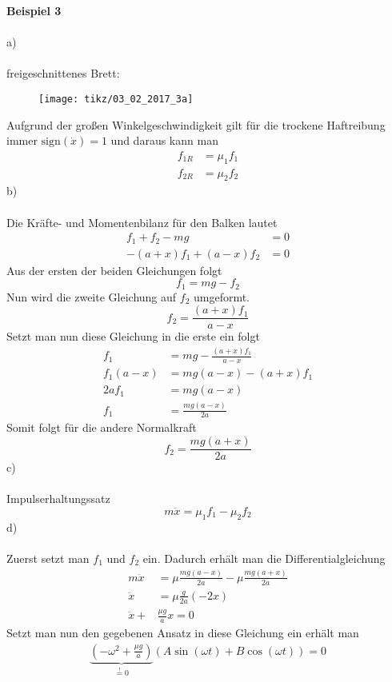 \textbf{Beispiel 3}\\ \\
a)\\ \\
freigeschnittenes Brett:
\begin{figure}[h]
	\centering
	\texttt{[image: tikz/03\_02\_2017\_3a]}
\end{figure}
\newline
Aufgrund der großen Winkelgeschwindigkeit gilt für die trockene Haftreibung immer $\text{sign}(\dot{x}) = 1$ und daraus kann man 
\begin{align*}
	f_{1R} &= \mu_1 f_1 \\
	f_{2R} &= \mu_2 f_2 
\end{align*}
\newpage
\noindent
b)\\ \\
Die Kräfte- und Momentenbilanz für den Balken lautet
\begin{align*}
	f_1 + f_2 - mg &= 0 \\
	-(a + x)f_1 + (a - x)f_2 &= 0
\end{align*}
Aus der ersten der beiden Gleichungen folgt
\[
	f_1 = mg - f_2
\]
Nun wird die zweite Gleichung auf $f_2$ umgeformt.
\[ 
	f_2 = \frac{(a + x)f_1}{a - x}
\]
Setzt man nun diese Gleichung in die erste ein folgt
\begin{align*}
	f_1 &= mg - \frac{(a + x)f_1}{a - x} \\
	f_1(a - x) &= mg(a - x) - (a + x)f_1 \\
	2af_1 &= mg (a - x) \\
	f_1 &= \frac{mg(a - x)}{2a}
\end{align*}
Somit folgt für die andere Normalkraft
\[
	f_2 = \frac{mg (a + x)}{2a}
\]
c)\\ \\
Impulserhaltungssatz
\[
	m\ddot{x} = \mu_1 f_1 - \mu_2 f_2
\]
d)\\ \\
Zuerst setzt man $f_1$ und $f_2$ ein. Dadurch erhält man die Differentialgleichung
\begin{align*}
	m\ddot{x} &= \mu \frac{mg(a - x)}{2a} - \mu\frac{mg (a + x)}{2a} \\
	\ddot{x} &= \mu \frac{g}{2a}(-2x) \\
	\ddot{x} + &\frac{\mu g}{a}x = 0
\end{align*}
Setzt man nun den gegebenen Ansatz in diese Gleichung ein erhält man
\begin{align*}
	\underbrace{\left(-\omega^2 + \frac{\mu g}{a}\right)}_{\overset{!}{=} 0} (A\sin(\omega t) + B\cos(\omega t)) = 0
\end{align*}

